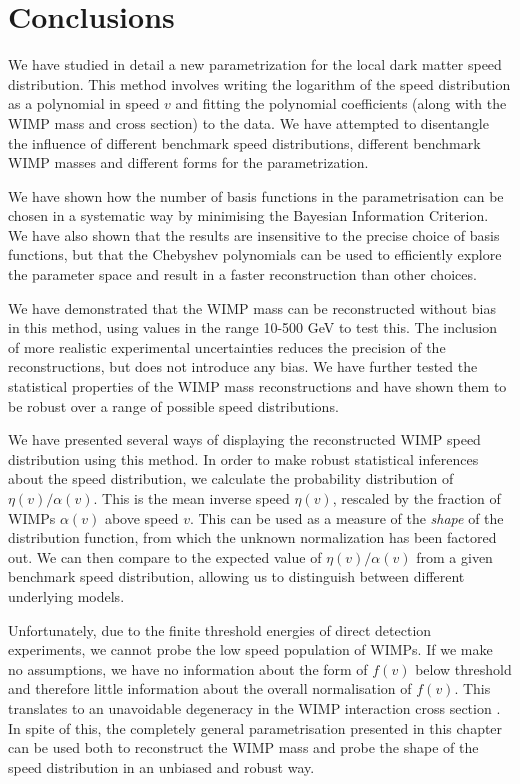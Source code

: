 \section{Conclusions}
\label{sec:Poly:conclusions}


We have studied in detail a new parametrization for the local dark matter speed distribution. This method involves writing the logarithm of the speed distribution as a polynomial in speed $v$ and fitting the polynomial coefficients (along with the WIMP mass and cross section) to the data. We have attempted to disentangle the influence of  different benchmark speed distributions, different benchmark WIMP masses and different forms for the parametrization. 

We have shown how the number of basis functions in the parametrisation can be chosen in a systematic way by minimising the Bayesian Information Criterion. We have also shown that the results are insensitive to the precise choice of basis functions, but that the Chebyshev polynomials can be used to efficiently explore the parameter space and result in a faster reconstruction than other choices. 

We have demonstrated that the WIMP mass can be reconstructed without bias in this method, using values in the range 10-500 GeV to test this. The inclusion of more realistic experimental uncertainties reduces the precision of the reconstructions, but does not introduce any bias. We have further tested the statistical properties of the WIMP mass reconstructions and have shown them to be robust over a range of possible speed distributions.

 We have presented several ways of displaying the reconstructed WIMP speed distribution using this method. In order to make robust statistical inferences about the speed distribution, we calculate the probability distribution of $\eta(v)/\alpha(v)$. This is the mean inverse speed $\eta(v)$, rescaled by the fraction of WIMPs $\alpha(v)$ above speed $v$. This can be used as a measure of the \textit{shape} of the distribution function, from which the unknown normalization has been factored out. We can then compare to the expected value of $\eta(v)/\alpha(v)$ from a given benchmark speed distribution, allowing us to distinguish between different underlying models.

Unfortunately, due to the finite threshold energies of direct detection experiments, we cannot probe the low speed population of WIMPs. If we make no assumptions, we have no information about the form of $f(v)$ below threshold and therefore little information about the overall normalisation of $f(v)$. This translates to an unavoidable degeneracy in the WIMP interaction cross section \sigmapsi. In spite of this, the completely general parametrisation presented in this chapter can be used both to reconstruct the WIMP mass and probe the shape of the speed distribution in an unbiased and robust way.

